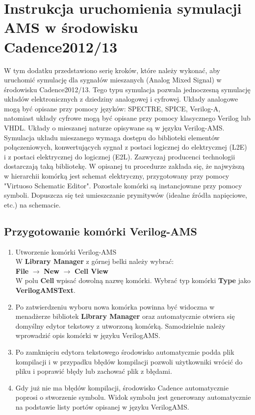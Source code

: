 \documentclass[10pt,a4paper,twoside]{report}
\theoremstyle{definition}
\theoremstyle{definition}
\theoremstyle{definition}
\theoremstyle{definition}
\theoremstyle{definition}
\begin{document}
{{{{{{{{	\chapter{Instrukcja uruchomienia symulacji AMS w środowisku Cadence2012/13}
	{	W tym dodatku przedstawiono serię kroków, które należy wykonać, aby uruchomić symulację dla sygnałów mieszanych (Analog Mixed Signal) w środowisku Cadence2012/13. Tego typu symulacja pozwala jednoczesną symulację układów elektronicznych z dziedziny analogowej i cyfrowej. Układy analogowe mogą być opisane przy pomocy języków: SPECTRE, SPICE, Verilog-A, natomiast układy cyfrowe mogą być opisane przy pomocy klasycznego Verilog lub VHDL. Układy o mieszanej naturze opisywane są w języku Verilog-AMS.}
	{	Symulacja układu mieszanego wymaga dostępu do biblioteki elementów połączeniowych, konwertujących sygnał z postaci logicznej do elektrycznej (L2E) i z postaci elektrycznej do logicznej (E2L). Zazwyczaj producenci technologii dostarczają taką bibliotekę.}
	{	W opisanej tu procedurze zakłada się, że najwyższą w hierarchii komórką jest schemat elektryczny, przygotowany przy pomocy "Virtuoso Schematic Editor". Pozostałe komórki są instancjowane przy pomocy symboli. Dopuszcza się też umieszczanie prymitywów (idealne źródła napięciowe, etc.) na schemacie.}
	\section{Przygotowanie komórki Verilog-AMS}
	\begin{enumerate}
		\item Utworzenie komórki Verilog-AMS \\
			W \textbf{Library Manager} z górnej belki należy wybrać: \\ 
			\textbf{File} $\rightarrow$ \textbf{New} $\rightarrow$ \textbf{Cell View} \\
			\subitem W polu \textbf{Cell} wpisać dowolną nazwę komórki.
			\subitem Wybrać typ komórki \textbf{Type} jako \textbf{VerilogAMSText}.
		\item Po zatwierdzeniu wyboru nowa komórka powinna być widoczna w menadżerze bibliotek \textbf{Library Manager} oraz automatycznie otwiera się domyślny edytor tekstowy z utworzoną komórką. Samodzielnie należy wprowadzić opis komórki w języku VerilogAMS.
		\item Po zamknięciu edytora tekstowego środowisko automatycznie podda plik kompilacji i w przypadku błędów kompilacji pozwoli użytkowniki wrócić do pliku i poprawić błędy lub zachować plik z błędami.
		\item Gdy już nie ma błędów kompilacji, środowisko Cadence automatycznie poprosi o stworzenie symbolu. Widok symbolu jest generowany automatycznie na podstawie listy portów opisanej w języku VerilogAMS.
	\end{enumerate}
}}}}}}}}
\end{document}
